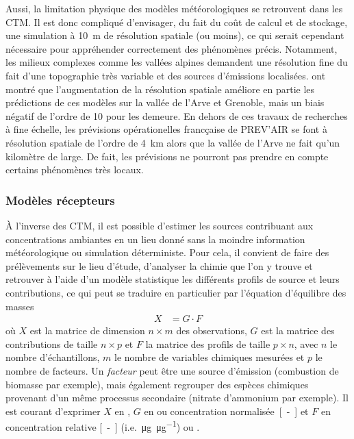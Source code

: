 Aussi, la limitation physique des modèles météorologiques se retrouvent dans les CTM. Il
est donc compliqué d'envisager, du fait du coût de calcul et de stockage, une simulation à
\SI{10}{\m} de résolution spatiale (ou moins), ce qui serait cependant nécessaire pour
appréhender correctement des phénomènes précis.
Notamment, les milieux complexes comme les vallées alpines demandent une résolution fine
du fait d'une topographie très variable et des sources d'émissions localisées.
\cite{bessagnetHigh2020} ont montré que l'augmentation de la résolution spatiale améliore
en partie les prédictions de ces modèles sur la vallée de l'Arve et Grenoble, mais un
biais négatif de l'ordre de \SI{10}{\ugm} pour les \PMdix{} demeure.
En dehors de ces travaux de recherches à fine échelle, les prévisions opérationelles
francçaise de PREV'AIR \parencite{rouilPrev2009} se font à résolution spatiale de l'ordre
de \SI{4}{\kilo\m} alors que la vallée de l'Arve ne fait qu'un kilomètre de large. De
fait, les prévisions ne pourront pas prendre en compte certains phénomènes très locaux.


\subsubsection{Modèles récepteurs}%
\label{ssub:model_recepteur}

À l'inverse des CTM, il est possible d'estimer les sources contribuant aux concentrations
ambiantes en un lieu donné sans la moindre information météorologique ou simulation
déterministe. Pour cela, il convient de faire des prélèvements sur le lieu d'étude,
d'analyser la chimie que l'on y trouve et retrouver à l'aide d'un modèle statistique
les différents profils de source et leurs contributions, ce qui peut se traduire en
particulier par l'équation d'équilibre des masses
\begin{align}
    \label{eq:mass_balance}
    X &= G \cdot F
\end{align}
où $X$ est la matrice de dimension $n\times m$ des observations, $G$ est la matrice des
contributions de taille $n\times p$ et $F$ la matrice des profils de taille $p \times n$,
avec $n$ le nombre d'échantillons, $m$ le nombre de variables chimiques mesurées et $p$ le
nombre de facteurs.
Un \textit{facteur} peut être une source d'émission (combustion de biomasse par exemple),
mais également regrouper des espèces chimiques provenant d'un même processus secondaire
(nitrate d'ammonium par exemple).
Il est courant d'exprimer $X$ en \si{\ugm}, $G$ en \si{\ugm} ou concentration
normalisée~\si{[-]} et $F$ en concentration relative \si{[-]}
(i.e.~\si{\micro\g\per\micro\g}) ou \si{\ugm}.

